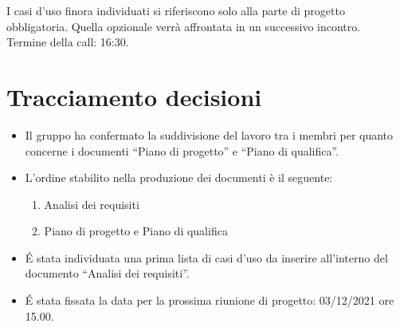 \noindent I casi d'uso finora individuati si riferiscono solo alla parte di progetto obbligatoria. Quella opzionale verrà affrontata in un successivo incontro. \\

\noindent Termine della call: 16:30.

\section{Tracciamento decisioni}

\begin{itemize}
	\item Il gruppo ha confermato la suddivisione del lavoro tra i membri per quanto concerne i documenti ``Piano di progetto'' e ``Piano di qualifica''.
	\item L'ordine stabilito nella produzione dei documenti è il seguente:
		\begin{enumerate}
		\item Analisi dei requisiti
		\item Piano di progetto e Piano di qualifica
		\end{enumerate}
	\item \' E stata individuata una prima lista di casi d'uso da inserire all'interno del documento ``Analisi dei requisiti''.
	\item \' E stata fissata la data per la prossima riunione di progetto: 03/12/2021 ore 15.00.
\end{itemize}
